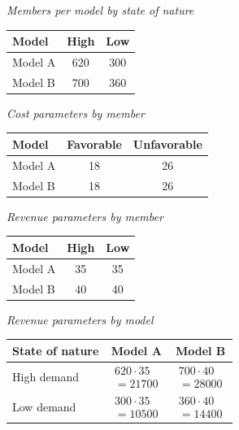 		\begin{center}
			\textit{Members per model by state of nature}\\
			\begin{tabular}{l c c}
				\toprule
				Model & High & Low \\
				\midrule
				Model A & 620 & 300 \\
				Model B & 700 & 360 \\
				\bottomrule
		\end{tabular}
		\end{center}
		\begin{center}
			\begin{minipage}[t]{0.48\linewidth}
				\textit{Cost parameters by member}
				\begin{center}
					\begin{tabular}{l c c}
						\toprule
						Model & Favorable & Unfavorable \\
						\midrule
						Model A & 18 & 26 \\
						Model B & 18 & 26 \\
						\bottomrule
					\end{tabular}
				\end{center}
			\end{minipage}
			\hfill
			\begin{minipage}[t]{0.48\linewidth}
				\textit{Revenue parameters by member}
				\begin{center}
					\begin{tabular}{l c c}
						\toprule
						Model & High & Low \\
						\midrule
						Model A & 35 & 35 \\
						Model B & 40 & 40 \\
						\bottomrule
					\end{tabular}
				\end{center}
			\end{minipage}
		\end{center}
		\begin{center}
			\textit{Revenue parameters by model} \\
			\begin{tabular}{l c c}
				\toprule
				State of nature & Model A & Model B \\
				\midrule
				High demand &
				$\begin{array}{l}
					620\cdot 35\\
					= 21700
				\end{array}$ &
				$\begin{array}{l}
					700\cdot 40\\
					= 28000
				\end{array}$ \\
				Low demand &
				$\begin{array}{l}
					300\cdot 35\\
					= 10500
				\end{array}$ &
				$\begin{array}{l}
					360\cdot 40\\
					= 14400
				\end{array}$ \\
				\bottomrule
			\end{tabular}
		\end{center}
